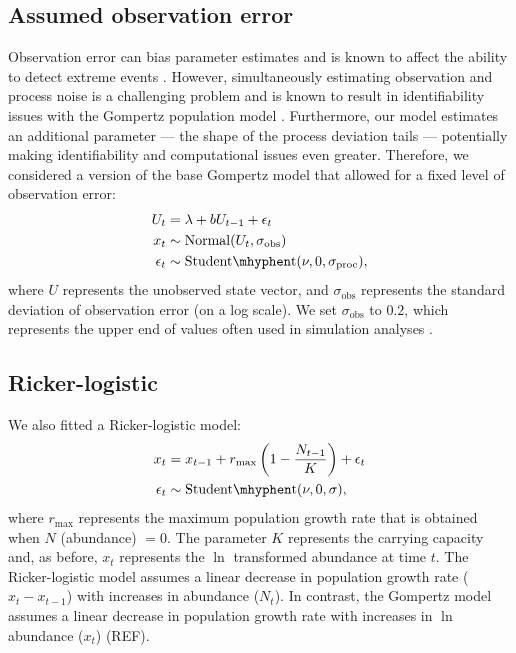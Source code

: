 \subsection{Assumed observation error}

Observation error can bias parameter estimates \citep[e.g.][]{knape2012} and is
known to affect the ability to detect extreme events \citep{ward2007}. However,
simultaneously estimating observation and process noise is a challenging
problem and is known to result in identifiability issues with the Gompertz
population model \citep{knape2008}. Furthermore, our model estimates an
additional parameter --- the shape of the process deviation tails ---
potentially making identifiability and computational issues even greater.
Therefore, we considered a version of the base Gompertz model that allowed for
a fixed level of observation error:
\begin{align*}
U_t &= \lambda + b U_{t-1} + \epsilon_t\\
x_t &\sim \mathrm{Normal}(U_t, \sigma_\mathrm{obs})\\
\epsilon_t &\sim \mathrm{Student\mhyphen t}(\nu, 0, \sigma_\mathrm{proc}),
\end{align*}
where $U$ represents the unobserved state vector, and $\sigma_\mathrm{obs}$
represents the standard deviation of observation error (on a log scale). We set
$\sigma_\mathrm{obs}$ to $0.2$, which represents the upper end of values often
used in simulation analyses \citep[e.g.][]{valpine2002, thorson2014b}.

\subsection{Ricker-logistic}

We also fitted a Ricker-logistic model:
\begin{align*}
x_t &= x_{t-1} + r_{\mathrm{max}}\left(1 - \frac{N_{t-1}}{K}\right) + \epsilon_t\\
\epsilon_t &\sim \mathrm{Student\mhyphen t}(\nu, 0, \sigma),
\end{align*}
where $r_\mathrm{max}$ represents the maximum population growth rate that is
obtained when $N$ (abundance) $= 0$. The parameter $K$ represents the carrying
capacity and, as before, $x_t$ represents the $\ln$ transformed abundance at
time $t$. The Ricker-logistic model assumes a linear decrease in population
growth rate ($x_t - x_{t-1}$) with increases in abundance ($N_t$). In contrast,
the Gompertz model assumes a linear decrease in population growth rate with
increases in $\ln$ abundance ($x_t$) (REF).


